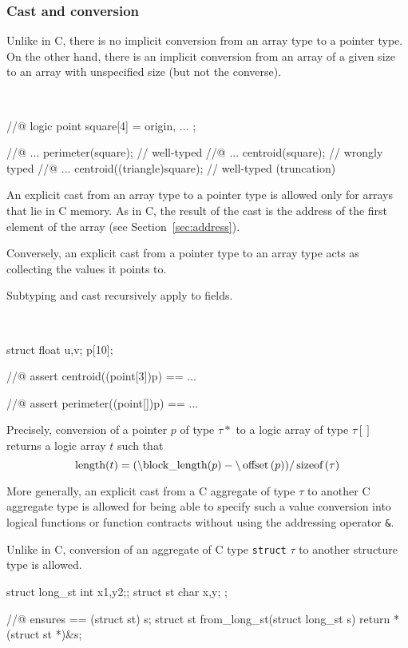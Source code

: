 \subsubsection{Cast and conversion}

Unlike in C, there is no implicit conversion from an array type to a
pointer type. On the other hand, there is an implicit conversion from
an array of a given size to an array with unspecified size (but not
the converse).

\begin{example}
~
\begin{listing-nonumber}
//@ logic point square[4] = { origin, ... };

//@ ... perimeter(square);          // well-typed
//@ ... centroid(square);           // wrongly typed
//@ ... centroid((triangle)square); // well-typed (truncation)
\end{listing-nonumber}
\end{example}

An explicit cast from an array type to a pointer type is allowed only
for arrays that lie in C memory. As in C, the result of the cast is
the address of the first element of the array (see
Section~\ref{sec:address}).

Conversely, an explicit cast from a pointer type to an array type
acts as collecting the values it points to.

Subtyping and cast recursively apply to fields.

\begin{example}
~
\begin{listing-nonumber}
  struct { float u,v; } p[10];

  //@ assert centroid((point[3])p) == ...

  //@ assert perimeter((point[])p) == ...
\end{listing-nonumber}
\end{example}

Precisely, conversion of a pointer $p$ of type $\tau*$ to a logic array of type
$\tau[]$ returns a logic array $t$ such that
\[
\lstinline|length|(t) = (
\blocklength\indexttbs{block\_length}
(p) - 
\lstinline|\offset|
(p))/\lstinline|sizeof|(\tau)
\]

More generally, an explicit cast from a C aggregate of type $\tau$ to another C 
aggregate type is allowed for being able to specify such a value conversion into logical functions or function contracts without using the addressing operator \lstinline|&|.

\begin{example}
Unlike in C, conversion of an aggregate of C type \lstinline|struct| $\tau$  to another structure type is allowed.

\begin{listing-nonumber}
  struct long_st { int x1,y2;};
  struct st { char x,y; };
  
  //@ ensures \result == (struct st) s;
  struct st from_long_st(struct long_st s) {
     return *(struct st *)&s;
  }
\end{listing-nonumber}
\end{example}

